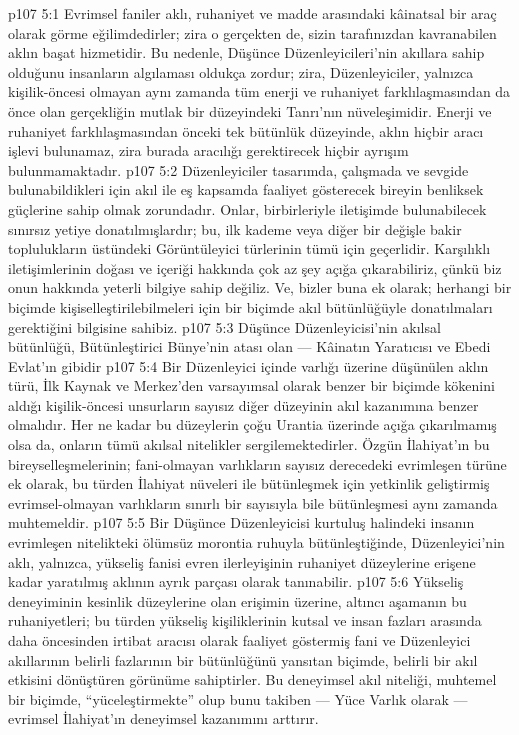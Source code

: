 \vs p107 5:1 Evrimsel faniler aklı, ruhaniyet ve madde arasındaki kâinatsal bir araç olarak görme eğilimdedirler; zira o gerçekten de, sizin tarafınızdan kavranabilen aklın başat hizmetidir. Bu nedenle, Düşünce Düzenleyicileri’nin akıllara sahip olduğunu insanların algılaması oldukça zordur; zira, Düzenleyiciler, yalnızca kişilik\hyp{}öncesi olmayan aynı zamanda tüm enerji ve ruhaniyet farklılaşmasından da önce olan gerçekliğin mutlak bir düzeyindeki Tanrı’nın nüveleşimidir. Enerji ve ruhaniyet farklılaşmasından önceki tek bütünlük düzeyinde, aklın hiçbir aracı işlevi bulunamaz, zira burada aracılığı gerektirecek hiçbir ayrışım bulunmamaktadır.
\vs p107 5:2 Düzenleyiciler tasarımda, çalışmada ve sevgide bulunabildikleri için akıl ile eş kapsamda faaliyet gösterecek bireyin benliksek güçlerine sahip olmak zorundadır. Onlar, birbirleriyle iletişimde bulunabilecek sınırsız yetiye donatılmışlardır; bu, ilk kademe veya diğer bir değişle bakir toplulukların üstündeki Görüntüleyici türlerinin tümü için geçerlidir. Karşılıklı iletişimlerinin doğası ve içeriği hakkında çok az şey açığa çıkarabiliriz, çünkü biz onun hakkında yeterli bilgiye sahip değiliz. Ve, bizler buna ek olarak; herhangi bir biçimde kişiselleştirilebilmeleri için bir biçimde akıl bütünlüğüyle donatılmaları gerektiğini bilgisine sahibiz.
\vs p107 5:3 Düşünce Düzenleyicisi’nin akılsal bütünlüğü, Bütünleştirici Bünye’nin  atası olan --- Kâinatın Yaratıcısı ve Ebedi Evlat’ın gibidir
\vs p107 5:4 Bir Düzenleyici içinde varlığı üzerine düşünülen aklın türü, İlk Kaynak ve Merkez’den varsayımsal olarak benzer bir biçimde kökenini aldığı kişilik\hyp{}öncesi unsurların sayısız diğer düzeyinin akıl kazanımına benzer olmalıdır. Her ne kadar bu düzeylerin çoğu Urantia üzerinde açığa çıkarılmamış olsa da, onların tümü akılsal nitelikler sergilemektedirler. Özgün İlahiyat’ın bu bireyselleşmelerinin; fani\hyp{}olmayan varlıkların sayısız derecedeki evrimleşen türüne ek olarak, bu türden İlahiyat nüveleri ile bütünleşmek için yetkinlik geliştirmiş evrimsel\hyp{}olmayan varlıkların sınırlı bir sayısıyla bile bütünleşmesi aynı zamanda muhtemeldir.
\vs p107 5:5 Bir Düşünce Düzenleyicisi kurtuluş halindeki insanın evrimleşen nitelikteki ölümsüz morontia ruhuyla bütünleştiğinde, Düzenleyici’nin aklı, yalnızca, yükseliş fanisi evren ilerleyişinin ruhaniyet düzeylerine erişene kadar yaratılmış aklının ayrık parçası olarak tanınabilir.
\vs p107 5:6 Yükseliş deneyiminin kesinlik düzeylerine olan erişimin üzerine, altıncı aşamanın bu ruhaniyetleri; bu türden yükseliş kişiliklerinin kutsal ve insan fazları arasında daha öncesinden irtibat aracısı olarak faaliyet göstermiş fani ve Düzenleyici akıllarının belirli fazlarının bir bütünlüğünü yansıtan biçimde, belirli bir akıl etkisini dönüştüren görünüme sahiptirler. Bu deneyimsel akıl niteliği, muhtemel bir biçimde, “yüceleştirmekte” olup bunu takiben --- Yüce Varlık olarak --- evrimsel İlahiyat’ın deneyimsel kazanımını arttırır.
